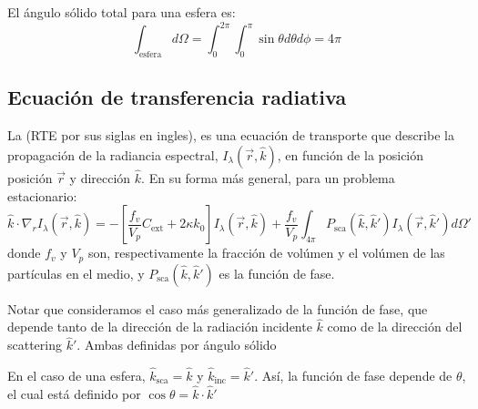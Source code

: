 \documentclass[letterpaper,10pt,english]{jupyterBook}
\begin{document}
\sphinxAtStartPar
El ángulo sólido total para una esfera es:
\begin{equation*}
\int_\mathrm{esfera} d\Omega = \int_0^{2\pi}\int_0^{\pi} \sin\theta d\theta d\phi= 4\pi
\end{equation*}

\subsection{Ecuación de transferencia radiativa}
\label{\detokenize{5_TransporteRadiativo/5_TransporteRadiativo:ecuacion-de-transferencia-radiativa}}
\sphinxAtStartPar
La  (RTE por sus siglas en ingles), es una ecuación de transporte que describe la propagación de la radiancia espectral, \(I_\lambda(\vec{r},\hat{k})\), en función de la posición posición \(\vec{r}\) y dirección \(\hat{k}\). En su forma más general, para un problema estacionario:
\label{equation:5_TransporteRadiativo/5_TransporteRadiativo:0b0fe890-cfae-4982-928f-aade87096709}\begin{equation}
\hat{k}\cdot\nabla_r I_\lambda(\vec{r},\hat{k}) = - \left[\frac{f_v}{V_p}C_\mathrm{ext} + 2\kappa k_0\right]I_\lambda(\vec{r},\hat{k}) + \frac{f_v}{V_p}\int_{4\pi} P_\mathrm{sca}(\hat{k},\hat{k}') I_\lambda(\vec{r},\hat{k}') d\Omega'
\end{equation}
\sphinxAtStartPar
donde \(f_v\) y \(V_p\) son, respectivamente la fracción de volúmen y el volúmen de las partículas en el medio, y \(P_\mathrm{sca}(\hat{k},\hat{k}')\) es la función de fase.

\sphinxAtStartPar
Notar que consideramos el caso más generalizado de la función de fase, que depende tanto de la dirección de la radiación incidente \(\hat{k}\) como de la dirección del scattering \(\hat{k}'\). Ambas definidas por ángulo sólido

\sphinxAtStartPar
En el caso de una esfera, \(\hat{k}_\mathrm{sca} = \hat{k}\) y \(\hat{k}_\mathrm{inc} = \hat{k}'\). Así, la función de fase depende de \(\theta\), el cual está definido por \(\cos\theta = \hat{k}\cdot\hat{k}'\)
\end{document}
